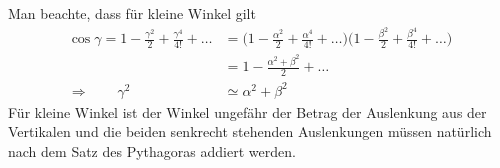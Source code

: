 \begin{diskussion}
Man beachte, dass für kleine Winkel gilt
\begin{align*}
\cos\gamma=
1-\frac{\gamma^2}2+\frac{\gamma^4}{4!}+\dots
&=
\biggl(
1-\frac{\alpha^2}2+\frac{\alpha^4}{4!}+\dots
\biggl)
\biggl(
1-\frac{\beta^2}2+\frac{\beta^4}{4!}+\dots
\biggl)
\\
&=
1-\frac{\alpha^2+\beta^2}2+\dots
\\
\Rightarrow\qquad
\gamma^2&\simeq\alpha^2+\beta^2
\end{align*}
Für kleine Winkel ist der Winkel ungefähr der Betrag der Auslenkung aus der
Vertikalen und die beiden senkrecht stehenden Auslenkungen müssen natürlich
nach dem Satz des Pythagoras addiert werden.
\end{diskussion}

